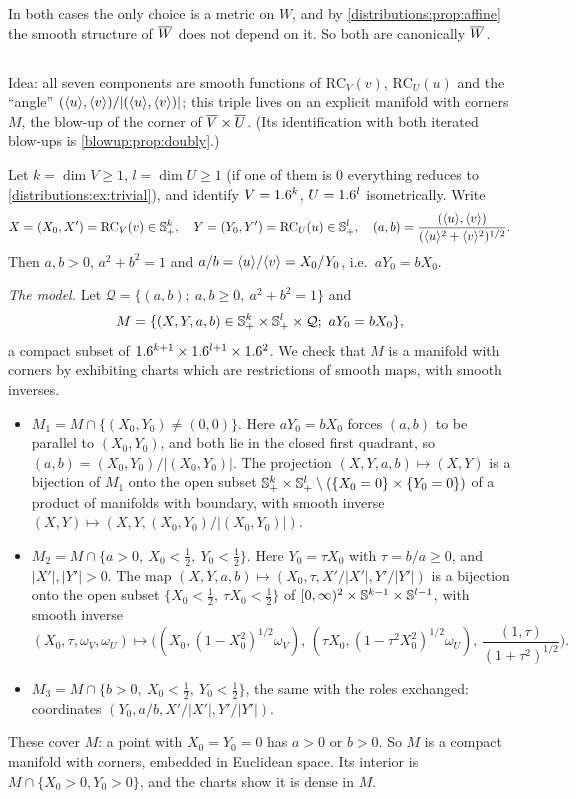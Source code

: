 In both cases the only choice is a metric on $W$, and by \cref{distributions:prop:affine}
the smooth structure of $\overline{W}$ does not depend on it. So both are canonically $\overline{W}$.

\subsection*{}
Idea: all seven components are smooth functions of $\mathrm{RC}_V(v)$, $\mathrm{RC}_U(u)$
and the ``angle'' $(\langle u\rangle,\langle v\rangle)/|(\langle u\rangle,\langle v\rangle)|$; this triple lives on an explicit
manifold with corners $M$, the blow-up of the corner of $\overline{V}\times\overline{U}$.
(Its identification with both iterated blow-ups is \cref{blowup:prop:doubly}.)

Let $k=\dim V\ge1$, $l=\dim U\ge1$ (if one of them is $0$ everything reduces to
\cref{distributions:ex:trivial}), and identify $V=1.6^k$, $U=1.6^l$ isometrically. Write
\[
  X=(X_0,X')=\mathrm{RC}_V(v)\in\mathbb{S}^k_+,\quad Y=(Y_0,Y')=\mathrm{RC}_U(u)\in\mathbb{S}^l_+,\quad
  (a,b)=\frac{(\langle u\rangle,\langle v\rangle)}{(\langle u\rangle^2+\langle v\rangle^2)^{1/2}}.
\]
Then $a,b>0$, $a^2+b^2=1$ and $a/b=\langle u\rangle/\langle v\rangle=X_0/Y_0$, i.e.\ $aY_0=bX_0$.

\emph{The model.} Let $\mathcal{Q}=\{(a,b);\ a,b\ge0,\ a^2+b^2=1\}$ and
\[
  M=\{(X,Y,a,b)\in\Sphere^k_+\times\Sphere^l_+\times\mathcal{Q};\ aY_0=bX_0\},
\]
a compact subset of $1.6^{k+1}\times1.6^{l+1}\times1.6^2$. We check that $M$ is a manifold
with corners by exhibiting charts which are restrictions of smooth maps, with smooth
inverses.
\begin{itemize}
\item $M_1=M\cap\{(X_0,Y_0)\neq(0,0)\}$. Here $aY_0=bX_0$ forces $(a,b)$ to be parallel
  to $(X_0,Y_0)$, and both lie in the closed first quadrant, so
  $(a,b)=(X_0,Y_0)/|(X_0,Y_0)|$. The projection $(X,Y,a,b)\mapsto(X,Y)$ is a bijection of
  $M_1$ onto the open subset $\mathbb{S}^k_+\times\mathbb{S}^l_+\setminus(\{X_0=0\}\times\{Y_0=0\})$
  of a product of manifolds with boundary, with smooth inverse
  $(X,Y)\mapsto(X,Y,(X_0,Y_0)/|(X_0,Y_0)|)$.
\item $M_2=M\cap\{a>0,\ X_0<\frac12,\ Y_0<\frac12\}$. Here $Y_0=\tau X_0$ with
  $\tau=b/a\ge0$, and $|X'|,|Y'|>0$. The map
  $(X,Y,a,b)\mapsto(X_0,\tau,X'/|X'|,Y'/|Y'|)$ is a bijection onto the open subset
  $\{X_0<\frac12,\ \tau X_0<\frac12\}$ of $[0,\infty)^2\times\mathbb{S}^{k-1}\times\mathbb{S}^{l-1}$,
  with smooth inverse
  \[
    (X_0,\tau,\omega_V,\omega_U)\mapsto\Big((X_0,(1-X_0^2)^{1/2}\omega_V),\,
    (\tau X_0,(1-\tau^2X_0^2)^{1/2}\omega_U),\,\frac{(1,\tau)}{(1+\tau^2)^{1/2}}\Big).
  \]
\item $M_3=M\cap\{b>0,\ X_0<\frac12,\ Y_0<\frac12\}$, the same with the roles exchanged:
  coordinates $(Y_0,a/b,X'/|X'|,Y'/|Y'|)$.
\end{itemize}
These cover $M$: a point with $X_0=Y_0=0$ has $a>0$ or $b>0$. So $M$ is a compact
manifold with corners, embedded in Euclidean space. Its interior is
$M\cap\{X_0>0,Y_0>0\}$, and the charts show it is dense in $M$.

